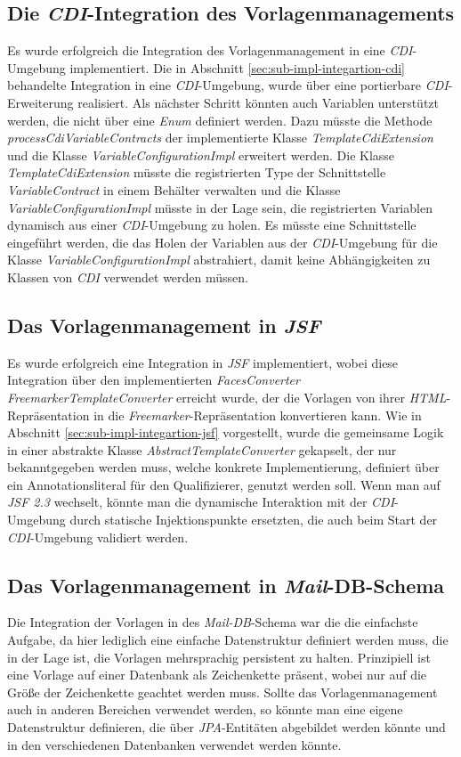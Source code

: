 \subsection{Die \emph{CDI}-Integration des Vorlagenmanagements}
Es wurde erfolgreich die Integration des Vorlagenmanagement in eine \emph{CDI}-Umgebung implementiert. Die in Abschnitt \ref{sec:sub-impl-integartion-cdi} behandelte Integration in eine \emph{CDI}-Umgebung, wurde über eine portierbare \emph{CDI}-Erweiterung realisiert. Als nächster Schritt könnten auch Variablen unterstützt werden, die nicht über eine \emph{Enum} definiert werden. Dazu müsste die Methode \emph{processCdiVariableContracts}  der implementierte Klasse \emph{TemplateCdiExtension} und die Klasse \emph{VariableConfigurationImpl} erweitert werden. Die Klasse \emph{TemplateCdiExtension} müsste die registrierten Type der Schnittstelle \emph{VariableContract} in einem Behälter verwalten und die Klasse \emph{VariableConfigurationImpl} müsste in der Lage sein, die registrierten Variablen dynamisch aus einer \emph{CDI}-Umgebung zu holen. Es müsste eine Schnittstelle eingeführt werden, die das Holen der Variablen aus der \emph{CDI}-Umgebung für die Klasse \emph{VariableConfigurationImpl} abstrahiert, damit keine Abhängigkeiten zu Klassen von \emph{CDI} verwendet werden müssen.

\subsection{Das Vorlagenmanagement in \emph{JSF}}
Es wurde erfolgreich eine Integration in \emph{JSF} implementiert, wobei diese Integration über den implementierten \emph{FacesConverter} \emph{FreemarkerTemplateConverter} erreicht wurde, der die Vorlagen von ihrer \emph{HTML}-Repräsentation in die \emph{Freemarker}-Repräsentation konvertieren kann. Wie in Abschnitt \ref{sec:sub-impl-integartion-jsf} vorgestellt, wurde die gemeinsame Logik in einer abstrakte Klasse \emph{AbstractTemplateConverter} gekapselt, der nur bekanntgegeben werden muss, welche konkrete Implementierung, definiert über ein Annotationsliteral für den Qualifizierer, genutzt werden soll. Wenn man auf \emph{JSF 2.3} wechselt, könnte man die dynamische Interaktion mit der \emph{CDI}-Umgebung durch statische Injektionspunkte ersetzten, die auch beim Start der \emph{CDI}-Umgebung validiert werden. 

\subsection{Das Vorlagenmanagement in \emph{Mail}-DB-Schema}
Die Integration der Vorlagen in des \emph{Mail-DB}-Schema war die die einfachste Aufgabe, da hier lediglich eine einfache Datenstruktur definiert werden muss, die in der Lage ist, die Vorlagen mehrsprachig persistent zu halten. Prinzipiell ist eine Vorlage auf einer Datenbank als Zeichenkette präsent, wobei nur auf die Größe der Zeichenkette geachtet werden muss. Sollte das Vorlagenmanagement auch in anderen Bereichen verwendet werden, so könnte man eine eigene Datenstruktur definieren, die über \emph{JPA}-Entitäten abgebildet werden könnte und in den verschiedenen Datenbanken verwendet werden könnte.
